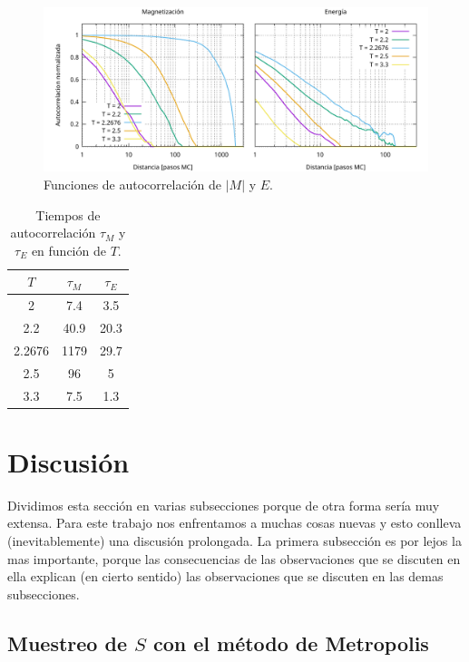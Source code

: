 \documentclass[a4paper,12pt]{article}
\begin{document}
\begin{figure}[h!]
    \centering
    \includegraphics[width = \textwidth]{../img/e.pdf}
    \caption{Funciones de autocorrelación de $|M|$ y $E$.}
    \label{fig:e}
\end{figure}

\newpage

\begin{table}[h!]
    \centering
    \begin{tabular}{c|c|c}
        $T$ & $\tau_M$ & $\tau_E$ \\ \hline
        2 & 7.4 & 3.5 \\
        2.2 & 40.9 & 20.3 \\
        2.2676 & 1179 & 29.7 \\
        2.5 & 96 & 5  \\
        3.3 & 7.5 & 1.3  \\
    \end{tabular}
    \caption{Tiempos de autocorrelación \( \tau_M \) y \( \tau_E \) en función de $T$.}
    \label{tab:tau}
\end{table}

\section{Discusión}

Dividimos esta sección en varias subsecciones porque de otra forma sería muy extensa. Para este trabajo nos enfrentamos a muchas cosas nuevas y esto conlleva (inevitablemente) una discusión prolongada. La primera subsección es por lejos la mas importante, porque las consecuencias de las observaciones que se discuten en ella explican (en cierto sentido) las observaciones que se discuten en las demas subsecciones.

\subsection{Muestreo de $S$ con el método de Metropolis}
\end{document}
